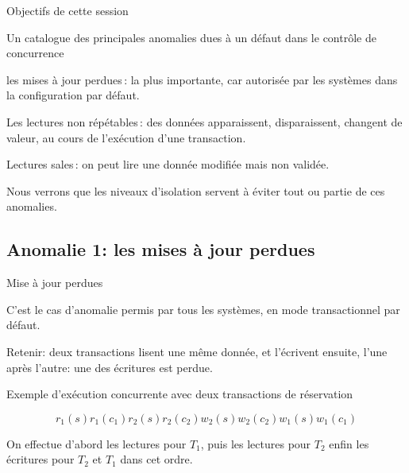 

\begin{frame}{Objectifs de cette session}

Un catalogue des principales anomalies dues à un défaut dans le
contrôle de concurrence

\vfill

\begin{redbullet}
  \item les \alert{mises à jour perdues}\,: la plus importante, car autorisée
      par les systèmes dans la configuration par défaut.
 
    \item Les \alert{lectures non répétables}\,: des données apparaissent, disparaissent,
        changent de valeur, au cours de l'exécution d'une transaction.
      
  \item  \alert{Lectures sales}\,: on peut lire une donnée modifiée mais non validée.
  
 \end{redbullet}

\vfill

\begin{blocgauche}
Nous verrons que les \alert{niveaux d'isolation} servent à éviter
tout ou partie de ces anomalies.
\end{blocgauche}
\end{frame}


\subsection{Anomalie 1: les mises à jour perdues}

\begin{frame}{Mise à jour perdues}

C'est \alert{le} cas d'anomalie permis par \alert{tous} les systèmes,
en mode transactionnel par défaut.

\vfill

Retenir: deux transactions \alert{lisent} une même donnée, et \alert{l'écrivent} ensuite, l'une après l'autre:
une des écritures est perdue.

\vfill

Exemple d'exécution concurrente avec deux transactions de réservation

$$   r_1(s)  r_1(c_1) r_2(s)  r_2(c_2)  w_2(s)  w_2(c_2) w_1(s) w_1(c_1)$$

\vfill
\begin{blocgauche}
On effectue d'abord les lectures pour $T_1$, puis les
lectures pour $T_2$ enfin les écritures pour $T_2$ et $T_1$
dans cet ordre.
\end{blocgauche}
\end{frame}


